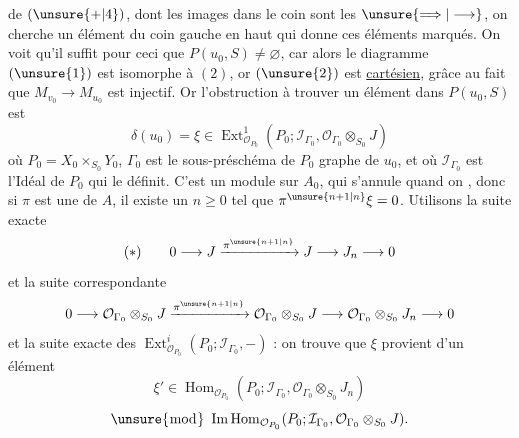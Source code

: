  de $(\unsure{+|4})$, dont les images dans le coin
 sont les $\unsure{\Longrightarrow|\longrightarrow}$, on cherche un élément
du coin gauche en haut qui donne ces
éléments marqués. On voit qu'il suffit pour
ceci que $P(u_0,S)\ne\varnothing$, car alors le diagramme
$(\unsure{1})$ est isomorphe à $(2)$, or $(\unsure{2})$ est
\uline{cartésien}, grâce au fait que $M_{v_0}\longrightarrow M_{u_0}$ est
injectif. Or l'obstruction à trouver un
élément dans $P(u_0,S)$ est 
\[
\delta(u_0)=\xi\in\operatorname{Ext}^{1}_{\mathcal{O}_{P_0}}
(P_0;\mathcal{I}_{\Gamma_0},\mathcal{O}_{\Gamma_0}\otimes_{S_0}J)
\]
où $P_0=X_0\times_{S_0}Y_0$,  $\Gamma_0$ est le sous-préschéma
de $P_0$ graphe de $u_0$, et où $\mathcal{I}_{\Gamma_0}$ est l'Idéal de $P_0$
qui le définit. C'est un module sur $A_0$,
qui s'annule quand on 
, donc
si $\pi$ est une  de $A$, il existe un
$n\geq0$ tel que $\pi^{\unsure{n+1|n}}\xi=0$. Utilisons la suite exacte
\[
(*)\qquad 0\longrightarrow J\xrightarrow{\pi^{\unsure{n+1|n}}}J\longrightarrow J_n\longrightarrow0
\]
et la suite correspondante
\[
0\longrightarrow\mathcal{O}_{\Gamma_0}\otimes_{S_0}J
\xrightarrow{\pi^{\unsure{n+1|n}}}\mathcal{O}_{\Gamma_0}\otimes_{S_0}J
\longrightarrow\mathcal{O}_{\Gamma_0}\otimes_{S_0}J_n\longrightarrow0
\]
et la suite exacte des $\operatorname{Ext}^{i}_{\mathcal{O}_{P_0}}(P_0;\mathcal{I}_{\Gamma_0},-)$ : on
trouve que $\xi$ provient d'un élément
\[
\xi'\in\operatorname{Hom}_{\mathcal{O}_{P_0}}(P_0;\mathcal{I}_{\Gamma_0},\mathcal{O}_{\Gamma_0}\otimes_{S_0}J_n)
\]
\[
\unsure{\bmod}\ \operatorname{Im}\operatorname{Hom}_{\mathcal{O}_{P_0}}
(P_0;\mathcal{I}_{\Gamma_0},\mathcal{O}_{\Gamma_0}\otimes_{S_0}J).
\]

